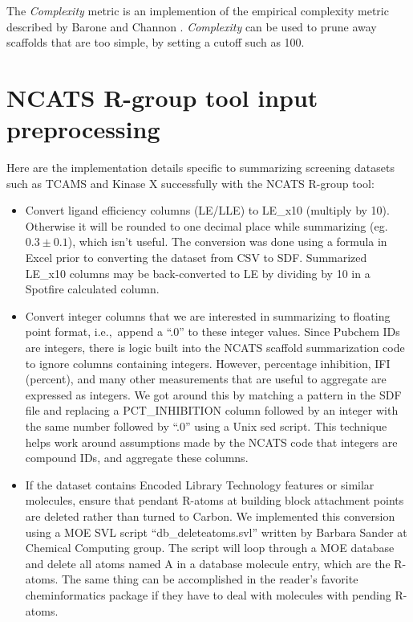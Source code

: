 \documentclass[11pt,letterpaper,biochem]{article}
\newcommand*\ie{i.e.,~}
\begin{document}
The \textit{Complexity} metric is an implemention of the empirical
complexity metric described by Barone and Channon \cite{Barone2001}.
\textit{Complexity} can be used to prune away scaffolds that are too
simple, by setting a cutoff such as 100.

\newpage 

\section{NCATS R-group tool input preprocessing}
\label{sec:ncats-prepro}
Here are the implementation details specific to summarizing screening datasets such as TCAMS and Kinase X successfully with the NCATS R-group tool:
\begin{itemize}

\item Convert ligand efficiency columns (LE/LLE) to LE\_x10 (multiply by 10). Otherwise it will be rounded to one decimal place while summarizing (eg. $0.3 \pm  0.1$), which isn't useful. The conversion was done using a formula in Excel prior to converting the dataset from CSV to SDF. Summarized LE\_x10 columns may be back-converted to LE by dividing by 10 in a Spotfire calculated column.  

\item Convert integer columns that we are interested in summarizing to floating point format, \ie append a ``.0'' to these integer values. Since Pubchem IDs are integers, there is logic built into the NCATS scaffold summarization code to ignore columns containing integers. However, percentage inhibition, IFI (percent), and many other measurements that are useful to aggregate are expressed as integers.  We got around this by matching a pattern in the SDF file and replacing a PCT\_INHIBITION column followed by an integer with the same number followed by ``.0'' using a Unix sed script. This technique helps work around assumptions made by the NCATS code that integers are compound IDs, and aggregate these columns.
  
\item If the dataset contains Encoded Library Technology features or similar molecules, ensure that pendant  R-atoms  at building block attachment points are deleted rather than turned to Carbon. We implemented this conversion using a MOE SVL script ``db\_deleteatoms.svl'' written by Barbara Sander at Chemical Computing group. The script will loop through a MOE database and delete all atoms named  A  in a database molecule entry, which are the R-atoms. The same thing can be accomplished in the reader's favorite cheminformatics package if they have to deal with molecules with pending R-atoms.  
\end{itemize}
\end{document}
